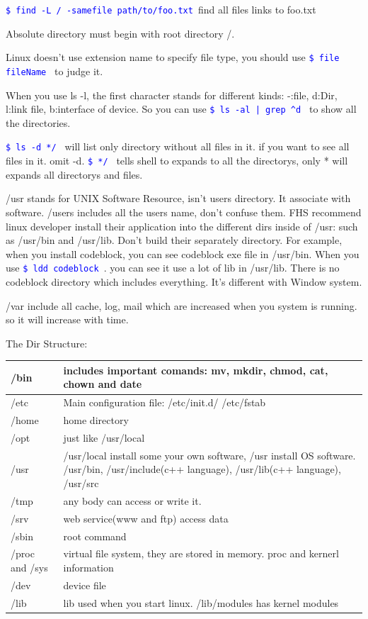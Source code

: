 \documentclass[paper=8.5in:11in, twoside, 12pt, pagesize=pdftex]{book}
\newcommand{\linuxcommand}[1]{\texttt{\textcolor{blue}{\$ #1 \Pisymbol{psy}{191}}}}
\begin{document}
		\linuxcommand{find -L / -samefile path/to/foo.txt}find all files links to foo.txt

		Absolute directory must begin with root directory /.
		
		Linux doesn't use extension name to specify file type, you should use \linuxcommand{file fileName} to judge it.  

	    When you use ls -l, the first character stands for different kinds: -:file, d:Dir, l:link file, b:interface of device. So you can use \linuxcommand{ls -al | grep \^{}d} to show all the directories. 
	 
		\linuxcommand{ls -d */} will list only directory without all files in it. if you want to see all files in it. omit -d. \linuxcommand{*/} tells shell to expands to all the directorys, only * will expands all directorys and files. 
 
		/usr stands for UNIX Software Resource, isn't users directory. It associate with software. /users includes all the users name, don't confuse them. FHS recommend linux developer install their application into the different dirs inside of /usr:  such as /usr/bin and /usr/lib. Don't build their separately directory.  For example, when you install codeblock, you can see codeblock exe file in /usr/bin. When you use \linuxcommand{ldd codeblock}. you can see it use a lot of lib in /usr/lib. There is no codeblock directory which includes everything.  It's different with Window system.
		   	
        /var include all cache, log, mail which are increased when you system is running. so it will increase with time. 
         
		The Dir Structure:
\begin{center}
\begin{tabular}{p{}|p{}}
  \hline
  /bin & includes important comands: mv, mkdir, chmod, cat, chown and date  \\
 \hline  /etc & Main configuration file: /etc/init.d/ /etc/fstab \\
  \hline /home & home directory \\
  \hline /opt & just like /usr/local  \\
  \hline /usr & /usr/local install some your own software, /usr install OS software.  /usr/bin, /usr/include(c++ language), /usr/lib(c++ language),  /usr/src \\
  \hline /tmp & any body can access or write it.     \\
  \hline /srv & web service(www and ftp) access data \\
  \hline /sbin & root command \\
  \hline /proc and /sys & virtual file system, they are stored in memory.  proc and kernerl information \\
  \hline /dev & device file \\
  \hline /lib & lib used when you start linux. /lib/modules has kernel modules \\
  \hline 
\end{tabular} 
 \end{center}
 
\end{document}
